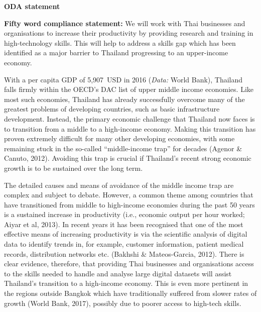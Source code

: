 \documentclass[11pt]{article}
\begin{document}
  \setcounter{figure}{0}
  
  \noindent
  {\LARGE \bf ODA statement}
  
  \vspace{2mm}
  \noindent
  {\bf Fifty word compliance statement:} We will work with Thai businesses and organisations to increase their productivity by providing research and training in high-technology skills. This will help to address a skills gap which has been identified as a major barrier to Thailand progressing to an upper-income economy.

  \vspace{2mm}
  \noindent
  With a per capita GDP of 5,907~USD in 2016 ({\it Data:} World Bank), Thailand falls firmly within the OECD's DAC list of upper middle income economies. Like most such economies, Thailand has already successfully overcome many of the greatest problems of developing countries, such as basic infrastructure development. Instead, the primary economic challenge that Thailand now faces is to transition from a middle to a high-income economy. Making this transition has proven extremely difficult for many other developing economies, with some remaining stuck in the so-called ``middle-income trap'' for decades (Agenor \& Canuto, 2012). Avoiding this trap is crucial if Thailand's recent strong economic growth is to be sustained over the long term.     
  
  \vspace{2mm}
  \noindent
  The detailed causes and means of avoidance of the middle income trap are complex and subject to debate. However, a common theme among countries that have transitioned from middle to high-income economies during the past 50 years is a sustained increase in productivity (i.e., economic output per hour worked; Aiyar et al, 2013). In recent years it has been recognised that one of the most effective means of increasing productivity is via the scientific analysis of digital data to identify trends in, for example, customer information, patient medical records, distribution networks etc. (Bakhshi \& Mateos-Garcia, 2012). There is clear evidence, therefore, that providing Thai businesses and organisations access to the skills needed to handle and analyse large digital datasets will assist Thailand's transition to a high-income economy. This is even more pertinent in the regions outside Bangkok which have traditionally suffered from slower rates of growth (World Bank, 2017), possibly due to poorer access to high-tech skills.    
  
\end{document}
